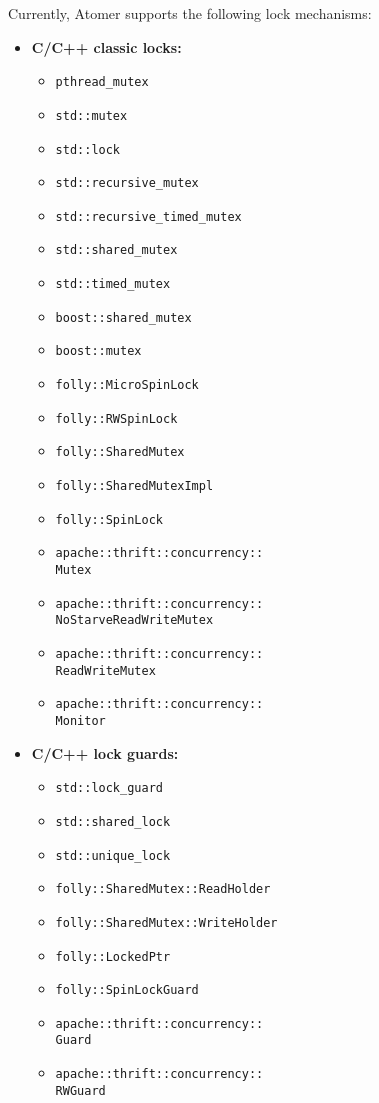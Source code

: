 Currently, Atomer supports the following lock mechanisms:
\begin{itemize}
    \item
        \textbf{C/C++ classic locks:}
        \begin{itemize}
            \item \texttt{pthread\_mutex}
            \item \texttt{std::mutex}
            \item \texttt{std::lock}
            \item \texttt{std::recursive\_mutex}
            \item \texttt{std::recursive\_timed\_mutex}
            \item \texttt{std::shared\_mutex}
            \item \texttt{std::timed\_mutex}
            \item \texttt{boost::shared\_mutex}
            \item \texttt{boost::mutex}
            \item \texttt{folly::MicroSpinLock}
            \item \texttt{folly::RWSpinLock}
            \item \texttt{folly::SharedMutex}
            \item \texttt{folly::SharedMutexImpl}
            \item \texttt{folly::SpinLock}
            \item \texttt{apache::thrift::concurrency::\\Mutex}
            \item \texttt{apache::thrift::concurrency::\\%
                NoStarveReadWriteMutex}
            \item \texttt{apache::thrift::concurrency::\\ReadWriteMutex}
            \item \texttt{apache::thrift::concurrency::\\Monitor}
        \end{itemize}

    \item
        \textbf{C/C++ lock guards:}
        \begin{itemize}
            \item \texttt{std::lock\_guard}
            \item \texttt{std::shared\_lock}
            \item \texttt{std::unique\_lock}
            \item \texttt{folly::SharedMutex::ReadHolder}
            \item \texttt{folly::SharedMutex::WriteHolder}
            \item \texttt{folly::LockedPtr}
            \item \texttt{folly::SpinLockGuard}
            \item \texttt{apache::thrift::concurrency::\\Guard}
            \item \texttt{apache::thrift::concurrency::\\RWGuard}
        \end{itemize}


\end{itemize}
